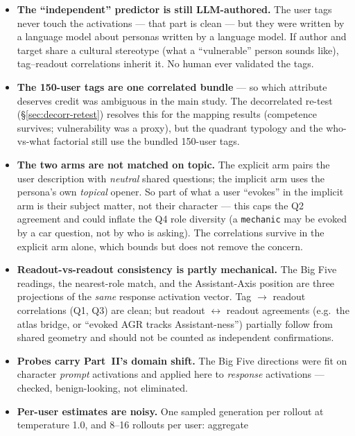 \documentclass[11pt]{article}
\begin{document}
\begin{itemize}
  \item \textbf{The ``independent'' predictor is still LLM-authored.} The user
        tags never touch the activations --- that part is clean --- but they
        were written by a language model about personas written by a language
        model. If author and target share a cultural stereotype (what a
        ``vulnerable'' person sounds like), tag--readout correlations inherit
        it. No human ever validated the tags.
  \item \textbf{The 150-user tags are one correlated bundle} --- so which
        attribute deserves credit was ambiguous in the main study. The
        decorrelated re-test (\S\ref{sec:decorr-retest}) resolves this for the
        mapping results (competence survives; vulnerability was a proxy), but
        the quadrant typology and the who-vs-what factorial still use the
        bundled 150-user tags.
  \item \textbf{The two arms are not matched on topic.} The explicit arm pairs
        the user description with \emph{neutral} shared questions; the implicit
        arm uses the persona's own \emph{topical} opener. So part of what a
        user ``evokes'' in the implicit arm is their subject matter, not their
        character --- this caps the Q2 agreement and could inflate the Q4 role
        diversity (a \texttt{mechanic} may be evoked by a car question, not by
        who is asking). The correlations survive in the explicit arm alone,
        which bounds but does not remove the concern.
  \item \textbf{Readout-vs-readout consistency is partly mechanical.} The Big
        Five readings, the nearest-role match, and the Assistant-Axis position
        are three projections of the \emph{same} response activation vector.
        Tag $\to$ readout correlations (Q1, Q3) are clean; but
        readout $\leftrightarrow$ readout agreements (e.g.\ the atlas bridge,
        or ``evoked AGR tracks Assistant-ness'') partially follow from shared
        geometry and should not be counted as independent confirmations.
  \item \textbf{Probes carry Part~II's domain shift.} The Big Five directions
        were fit on character \emph{prompt} activations and applied here to
        \emph{response} activations --- checked, benign-looking, not eliminated.
  \item \textbf{Per-user estimates are noisy.} One sampled generation per
        rollout at temperature 1.0, and 8--16 rollouts per user: aggregate

\end{itemize}
\end{document}
